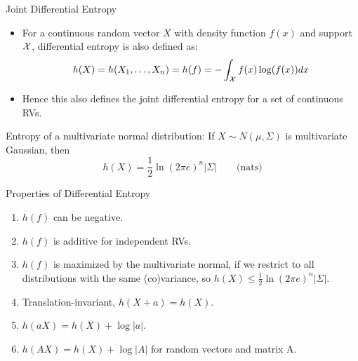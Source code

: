 \begin{vbframe}{Joint Differential Entropy} 
\begin{itemize}
\item For a continuous random vector $X$ with density function $f(x)$ and support $\mathcal{X}$, 
  differential entropy is also defined as:
$$ h(X) = h(X_1, \ldots, X_n) = h(f) = - \int_{\mathcal{X}} f(x) \log(f(x)) dx $$
\item Hence this also defines the joint differential entropy for a set of continuous RVs.
\end{itemize}

\lz
  
Entropy of a multivariate normal distribution: 
If $X \sim N(\mu, \Sigma)$ is multivariate Gaussian, then
  $$h(X) = \frac{1}{2} \ln(2 \pi e)^n |\Sigma| \qquad \text{(nats)}$$
\end{vbframe}

\begin{vbframe}{Properties of Differential Entropy} 
\begin{enumerate}
  \item $h(f)$ can be negative.
  \item $h(f)$ is additive for independent RVs.
  \item $h(f)$ is maximized by the multivariate normal, if we restrict 
    to all distributions with the same (co)variance, so
    $h(X) \leq \frac{1}{2} \ln(2 \pi e)^n |\Sigma|.$
\item Translation-invariant, $ h(X+a) = h(X)$. 
\item $h(aX) = h(X) + \log |a|$.
\item $h(AX) = h(X) + \log |A|$ for random vectors and matrix A.
\end{enumerate}
\end{vbframe}

\endlecture

